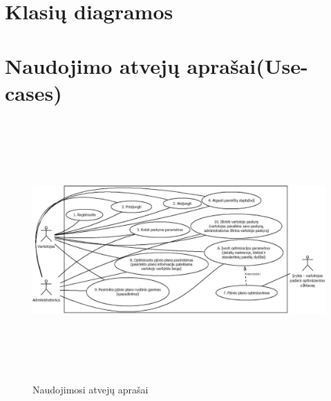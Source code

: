 \documentclass[a4paper,12pt]{article}
\begin{document}
\section{Klasių diagramos}


\section{Naudojimo atvejų aprašai(Use-cases)}
\begin{figure}[t]
\caption{Naudojimosi atvejų aprašai}
\includegraphics[width=18cm, height=10cm]{diagrama}
\centering
\end{figure}
\end{document}
